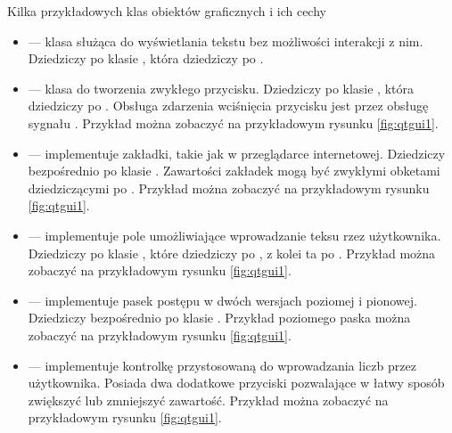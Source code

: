 \par
Kilka przykładowych klas obiektów graficznych i ich cechy
\begin{itemize}
    \item {} --- klasa służąca do wyświetlania tekstu bez możliwości interakcji z nim.
          Dziedziczy po klasie , która dziedziczy po .

    \item {} --- klasa do tworzenia zwykłego przycisku.
          Dziedziczy po klasie , która dziedziczy po .
          Obsługa zdarzenia wciśnięcia przycisku jest przez obsługę sygnału .
          Przykład można zobaczyć na przykładowym rysunku \ref{fig:qtgui1}.

    \item {} --- implementuje zakładki, takie jak w przeglądarce internetowej.
          Dziedziczy bezpośrednio po klasie .
          Zawartości zakładek mogą być zwykłymi obketami dziedziczącymi po .
          Przykład można zobaczyć na przykładowym rysunku \ref{fig:qtgui1}.

    \item {} --- implementuje pole umożliwiające wprowadzanie teksu rzez użytkownika.
          Dziedziczy po klasie , które dziedziczy po  , z kolei ta po .
          Przykład można zobaczyć na przykładowym rysunku \ref{fig:qtgui1}.

    \item {} --- implementuje pasek postępu w dwóch wersjach poziomej i pionowej.
          Dziedziczy bezpośrednio po klasie .
          Przykład poziomego paska można zobaczyć na przykładowym rysunku \ref{fig:qtgui1}.

    \item {} --- implementuje kontrolkę przystosowaną do wprowadzania liczb przez użytkownika.
          Posiada dwa dodatkowe przyciski pozwalające w łatwy sposób zwiększyć lub zmniejszyć zawartość.
          Przykład można zobaczyć na przykładowym rysunku \ref{fig:qtgui1}.

\end{itemize}